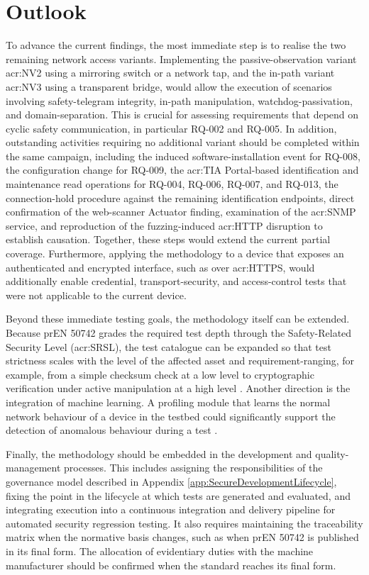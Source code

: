 \section{Outlook} 
\label{sec:future_work}

To advance the current findings, the most immediate step is to realise the two remaining network access variants. Implementing the passive-observation variant \gls{acr:NV2} using a mirroring switch or a network tap, and the in-path variant \gls{acr:NV3} using a transparent bridge, would allow the execution of scenarios involving safety-telegram integrity, in-path manipulation, watchdog-passivation, and domain-separation. This is crucial for assessing requirements that depend on cyclic safety communication, in particular RQ-002 and RQ-005. In addition, outstanding activities requiring no additional variant should be completed within the same campaign, including the induced software-installation event for RQ-008, the configuration change for RQ-009, the \gls{acr:TIA} Portal-based identification and maintenance read operations for RQ-004, RQ-006, RQ-007, and RQ-013, the connection-hold procedure against the remaining identification endpoints, direct confirmation of the web-scanner Actuator finding, examination of the \gls{acr:SNMP} service, and reproduction of the fuzzing-induced \gls{acr:HTTP} disruption to establish causation. Together, these steps would extend the current partial coverage. Furthermore, applying the methodology to a device that exposes an authenticated and encrypted interface, such as over \gls{acr:HTTPS}, would additionally enable credential, transport-security, and access-control tests that were not applicable to the current device.

Beyond these immediate testing goals, the methodology itself can be extended. Because prEN 50742 grades the required test depth through the Safety-Related Security Level (\gls{acr:SRSL}), the test catalogue can be expanded so that test strictness scales with the level of the affected asset and requirement-ranging, for example, from a simple checksum check at a low level to cryptographic verification under active manipulation at a high level \cite[p. 21]{prEN50742_2025}. Another direction is the integration of machine learning. A profiling module that learns the normal network behaviour of a device in the testbed could significantly support the detection of anomalous behaviour during a test \cite[pp. 12]{siboni2016securitytestbedinternetthings}.

Finally, the methodology should be embedded in the development and quality-management processes. This includes assigning the responsibilities of the governance model described in Appendix \ref{app:SecureDevelopmentLifecycle}, fixing the point in the lifecycle at which tests are generated and evaluated, and integrating execution into a continuous integration and delivery pipeline for automated security regression testing. It also requires maintaining the traceability matrix when the normative basis changes, such as when prEN 50742 is published in its final form. The allocation of evidentiary duties with the machine manufacturer should be confirmed when the standard reaches its final form.

